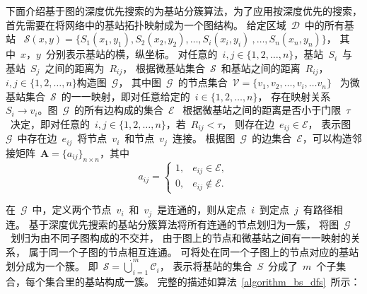 下面介绍基于图的深度优先搜索的为基站分簇算法，为了应用按深度优先的搜索，首先需要在将网络中的基站拓扑映射成为一个图结构。
给定区域~$\mathcal{D}$~中的所有基站
~$\mathcal{S}(x,y)=\{S_1(x_1,y_1), S_2(x_2,y_2),\dots,S_i(x_i,y_i)~,\dots,S_n(x_n,y_n)\}$，
其中~$x$，$y$~分别表示基站的横，纵坐标。
对任意的~$i,j\in\{1,2,\dots,n\}$，基站~$S_i$~与基站~$S_j$~之间的距离为~$R_{ij}$，
根据微基站集合~$\mathcal{S}$~和基站之间的距离~$R_{ij}$，$i,j \in\{1,2,\dots,n\}$构造图~$\mathcal{G}$，
其中图~$\mathcal{G}$~的节点集合~$\mathcal{V}=\{v_1,v_2,\dots,v_i,\dots v_n\}$~
为微基站集合~$\mathcal{S}$~的一一映射，即对任意给定的~$i\in\{1,2,\dots,n\}$，
存在映射关系~$S_i \rightarrow v_i$。图~$\mathcal{G}$~的所有边构成的集合~$\mathcal{E}$~
根据微基站之间的距离是否小于门限~$\tau$~决定，即对任意的~$i,j\in\{1,2,\dots,n\}$，若~$R_{ij}<\tau$，
则存在边~$e_{ij}\in\mathcal{E}$，
表示图~$\mathcal{G}$~中存在边~$e_{ij}$~将节点~$v_i$~和节点~$v_j$~连接。
根据图~$\mathcal{G}$~的边集合~$\mathcal{E}$，可以构造邻接矩阵~$\mathbf{A}=\{a_{ij}\}_{n\times n}$，其中
\begin{equation}
a_{ij}=
\begin{cases}
1, & e_{ij}\in \mathcal{E}, \\
0, & e_{ij}\notin \mathcal{E}.
\end{cases}
\end{equation}

在~$\mathcal{G}$~中，定义两个节点~$v_i$~和~$v_j$~是连通的，则从定点~$i$~到定点~$j$~有路径相连。
基于深度优先搜索的基站分簇算法将所有连通的节点划归为一簇，
将图~$\mathcal{G}$~划归为由不同子图构成的不交并，
由于图上的节点和微基站之间有一一映射的关系，
属于同一个子图的节点相互连通。
可将处在同一个子图上的节点对应的基站划分成为一个簇。
即~$\mathcal{S} = \dot{\bigcup\nolimits}_{i=1}^{m}\mathcal{C}_i$，
表示将基站的集合~$S$~分成了~$m$~个子集合，每个集合里的基站构成一簇。
完整的描述如算法~\ref{algorithm_bs_dfs}~所示：


